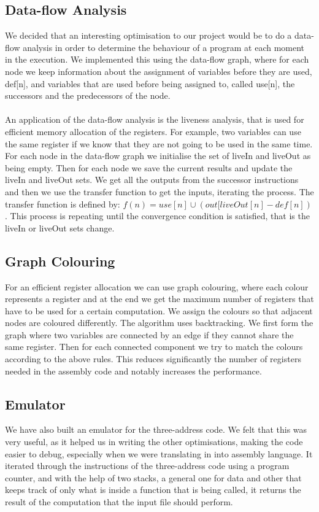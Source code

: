 \documentclass[a4wide, 11pt]{article}
\begin{document}
\subsection{Data-flow Analysis}
We decided that an interesting optimisation to our project would be to do a data-flow analysis in order to determine the behaviour of a program at each moment in the execution. We implemented this using the data-flow graph, where for each node we keep information about the assignment of variables before they are used, def[n], and variables that are used before being assigned to, called use[n], the successors and the  predecessors of the node. 
\\\\
An application of the data-flow analysis is the liveness analysis, that is used for efficient memory allocation of the registers. For example, two variables can use the same register if we know that they are not going to be used in the same time. For each node in the data-flow graph we initialise the set of liveIn and liveOut as being empty. Then for each node we save the current results and update the liveIn and liveOut sets. We get all the outputs from the successor instructions and then we use the transfer function to get the inputs, iterating the process. The transfer function is defined by:
$f(n) = use[n] \cup (out[liveOut[n] - def[n])$ .
This process is repeating until the convergence condition is satisfied, that is the liveIn or liveOut sets change.

\subsection{Graph Colouring}
For an efficient register allocation we can use graph colouring, where each colour represents a register and at the end we get the maximum number of registers that have to be used for a certain computation. We assign the colours so that adjacent nodes are coloured differently. The algorithm uses backtracking. We first form the graph where two variables are connected by an edge if they cannot share the same register. Then for each connected component we try to match the colours according to the above rules. This reduces significantly the number of registers needed in the assembly code and notably increases the performance.

\subsection{Emulator}
We have also built an emulator for the three-address code. We felt that this was very useful, as it helped us in writing the other optimisations, making the code easier to debug, especially when we were translating in into assembly language. It iterated through the instructions of the three-address code using a program counter, and with the help of two stacks, a general one for data and other that keeps track of only what is inside a function that is being called, it returns the result of the computation that the input file should perform.
\end{document}
